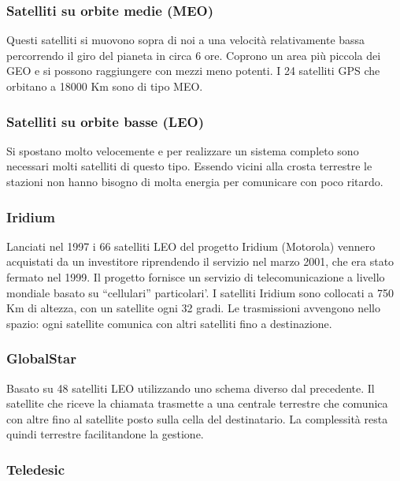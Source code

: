 \subsubsection{Satelliti su orbite medie (MEO)}

Questi satelliti si muovono sopra di noi a una velocità relativamente bassa percorrendo il giro del pianeta in circa 6 ore. Coprono un area più piccola dei GEO e si possono raggiungere con mezzi meno potenti. I 24 satelliti GPS che orbitano a 18000 Km sono di tipo MEO.

\subsubsection{Satelliti su orbite basse (LEO)}

Si spostano molto velocemente e per realizzare un sistema completo sono necessari molti satelliti di questo tipo. Essendo vicini alla crosta terrestre le stazioni non hanno bisogno di molta energia per comunicare con poco ritardo.

\subsubsection*{Iridium}					

Lanciati nel 1997 i 66 satelliti LEO del progetto Iridium (Motorola) vennero acquistati da un investitore riprendendo il servizio nel marzo 2001, che era stato fermato nel 1999. Il progetto fornisce un servizio di telecomunicazione a livello mondiale basato su ``cellulari'' particolari'. I satelliti Iridium sono collocati a 750 Km di altezza, con un satellite ogni 32 gradi. Le trasmissioni avvengono nello spazio: ogni satellite comunica con altri satelliti fino a destinazione.

\subsubsection*{GlobalStar}

Basato su 48 satelliti LEO utilizzando uno schema diverso dal precedente. Il satellite che riceve la chiamata trasmette a una centrale terrestre che comunica con altre fino al satellite posto sulla cella del destinatario. La complessità resta quindi terrestre facilitandone la gestione.

\subsubsection*{Teledesic}

